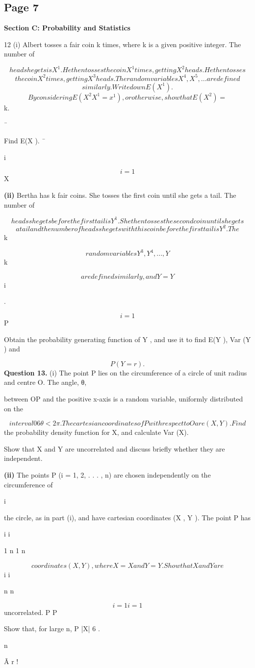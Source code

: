 \documentclass[12pt]{article}
\begin{document}
\subsection*{Page 7}
\begin{flushleft}
\bigskip\textbf{Section C: Probability and Statistics}\par
12 (i) Albert tosses a fair coin k times, where k is a given positive integer. The number of\par
\[heads he gets is X^1. He then tosses the coin X^1 times, getting X^2 heads. He then tosses\]
\[the coin X^2 times, getting X^3 heads. The random variables X^4, X^5, . . . are defined\]
\[similarly. Write down E(X^1).\]
\[By considering E(X^2 X^1 = x^1), or otherwise, show that E(X^2) =\]
k.\par
\infty\par
¯\par
Find E(X ). ¯\par
i\par
\[i=1\]
X\par
\textbf{(ii)} Bertha has k fair coins. She tosses the first coin until she gets a tail. The number of\par
\[heads she gets before the first tail is Y^1. She then tosses the second coin until she gets\]
\[a tail and the number of heads she gets with this coin before the first tail is Y^2. The\]
k\par
\[random variables Y^3, Y^4, . . . , Y\]
k\par
\[are defined similarly, and Y = Y\]
i\par
.\par
\[i=1\]
P\par
Obtain the probability generating function of Y , and use it to find E(Y ), Var (Y ) and\par
\[P(Y = r).\]
\bigskip\textbf{Question 13.} (i) The point P lies on the circumference of a circle of unit radius and centre O. The angle, θ,\par
between OP and the positive x-axis is a random variable, uniformly distributed on the\par
\[interval 0 6 θ < 2\pi. The cartesian coordinates of P with respect to O are (X, Y ). Find\]
the probability density function for X, and calculate Var (X).\par
Show that X and Y are uncorrelated and discuss briefly whether they are independent.\par
\textbf{(ii)} The points P (i = 1, 2, . . . , n) are chosen independently on the circumference of\par
i\par
the circle, as in part (i), and have cartesian coordinates (X , Y ). The point P has\par
i i\par
1 n 1 n\par
\[coordinates (X, Y ), where X = X and Y = Y . Show that X and Y are\]
i i\par
n n\par
\[i=1 i=1\]
uncorrelated. P P\par
Show that, for large n, P |X| 6  .\par
n\par
Ã r !\par
\end{flushleft}
\end{document}
